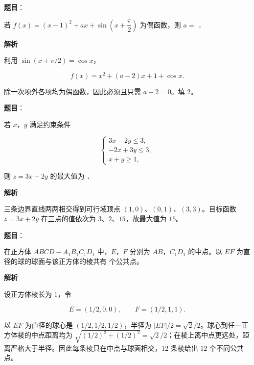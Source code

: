 \begin{answer}

\textbf{题目}：

若 $f(x)=(x-1)^2+ax+\sin\left(x+\dfrac\pi2\right)$ 为偶函数，则 $a=$ \gkblank{}．

\textbf{解析}

利用 $\sin(x+\pi/2)=\cos x$，

\nopagebreak[4]
\[
f(x)=x^2+(a-2)x+1+\cos x.
\]

除一次项外各项均为偶函数，因此必须且只需 $a-2=0$。填 $2$。


\end{answer}
\begin{answer}

\textbf{题目}：

若 $x$，$y$ 满足约束条件

\nopagebreak[4]
\[
\begin{cases}
3x-2y\leqslant3,\\
-2x+3y\leqslant3,\\
x+y\geqslant1,
\end{cases}
\]

则 $z=3x+2y$ 的最大值为 \gkblank{}．

\textbf{解析}

三条边界直线两两相交得到可行域顶点 $(1,0)$、$(0,1)$、$(3,3)$。目标函数 $z=3x+2y$ 在三点的值依次为 $3$、$2$、$15$，故最大值为 $15$。


\end{answer}
\begin{answer}

\textbf{题目}：

在正方体 $ABCD-A_1B_1C_1D_1$ 中，$E$，$F$ 分别为 $AB$，$C_1D_1$ 的中点。以 $EF$ 为直径的球的球面与该正方体的棱共有 \gkblank{} 个公共点。

\textbf{解析}

设正方体棱长为 $1$，令

\nopagebreak[4]
\[
E=(1/2,0,0),\qquad F=(1/2,1,1).
\]

以 $EF$ 为直径的球心是 $(1/2,1/2,1/2)$，半径为 $|EF|/2=\sqrt2/2$。球心到任一正方体棱的中点距离均为 $\sqrt{(1/2)^2+(1/2)^2}=\sqrt2/2$；在棱上离中点更远处，距离严格大于半径。因此每条棱只在中点与球面相交，$12$ 条棱给出 $12$ 个不同公共点。


\end{answer}
